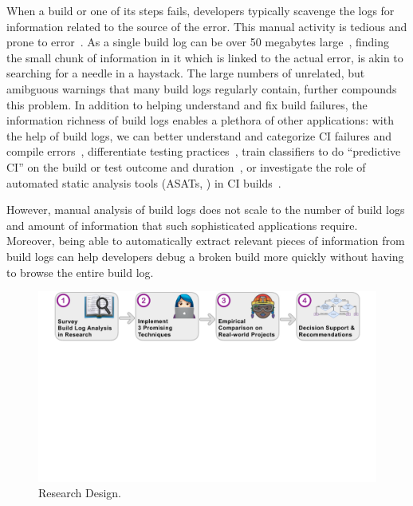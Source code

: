 When a build or one of its steps fails, developers typically scavenge
the logs for information related to the source of the error.
This
manual activity is tedious and prone to
error~\cite{santolucito2018statically}.
As a single build log can be
over 50 megabytes large~\cite{beller2017oops}, finding the small chunk
of information in it which is linked to the actual error, is akin to
searching for a needle in a haystack.
The large numbers of unrelated, but amibguous warnings that many build
logs regularly contain, further compounds this problem.
In addition to helping
understand and fix build failures, the information richness of build
logs enables a plethora of other applications: with the help of build
logs, we can better understand and categorize CI failures and compile
errors~\cite{islam2017insights,seo2014programmers}, differentiate
testing practices~\cite{orellana2017differences,vassallo2017a-tale},
train classifiers to do ``predictive CI'' on the build or test outcome
and
duration~\cite{ni2017cost,bisong2017built,haghighatkhah2018test,machalica2019predictive},
or investigate the role of automated static analysis tools (ASATs,
\cite{beller2016analyzing}) in CI
builds~\cite{zampetti2017open}.

However, manual analysis of build logs does not
scale to the number of build logs and amount of information that such
sophisticated applications require.
Moreover, being able to
automatically extract relevant pieces of information from build logs
can help
developers debug a broken build more quickly without having to browse
the entire build log.

\begin{figure}[htb]
	\centering
	\includegraphics[width=\textwidth, trim={1.2cm 10.5cm 1.2cm 0cm},
	clip]{img/overview.pdf}
	\caption{Research Design.}
	\label{fig:overview}
\end{figure}

